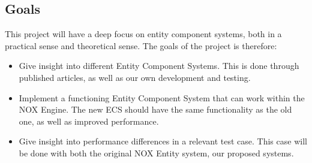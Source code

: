 \subsection{Goals}
This project will have a deep focus on entity component systems, both in a practical sense and theoretical sense.
The goals of the project is therefore:
\begin{itemize}
    \item 
        Give insight into different Entity Component Systems. 
        This is done through published articles, as well as our own development and testing.
    
    \item 
        Implement a functioning Entity Component System that can work within the NOX Engine.
        The new ECS should have the same functionality as the old one, as well as improved performance.

    \item
        Give insight into performance differences in a relevant test case. 
        This case will be done with both the original NOX Entity system, our proposed systems.
\end{itemize}